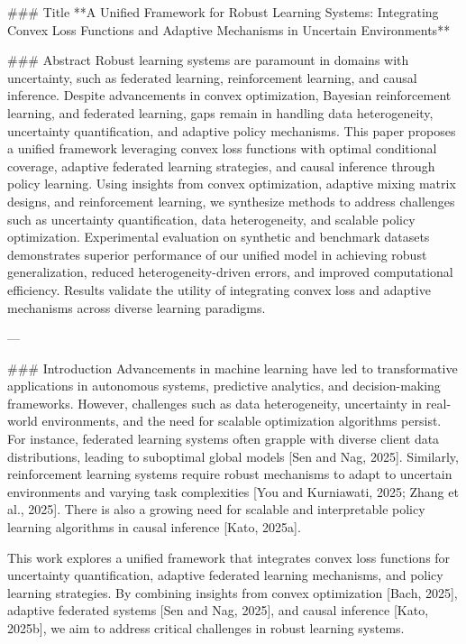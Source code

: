 ### Title
**A Unified Framework for Robust Learning Systems: Integrating Convex Loss Functions and Adaptive Mechanisms in Uncertain Environments**

### Abstract
Robust learning systems are paramount in domains with uncertainty, such as federated learning, reinforcement learning, and causal inference. Despite advancements in convex optimization, Bayesian reinforcement learning, and federated learning, gaps remain in handling data heterogeneity, uncertainty quantification, and adaptive policy mechanisms. This paper proposes a unified framework leveraging convex loss functions with optimal conditional coverage, adaptive federated learning strategies, and causal inference through policy learning. Using insights from convex optimization, adaptive mixing matrix designs, and reinforcement learning, we synthesize methods to address challenges such as uncertainty quantification, data heterogeneity, and scalable policy optimization. Experimental evaluation on synthetic and benchmark datasets demonstrates superior performance of our unified model in achieving robust generalization, reduced heterogeneity-driven errors, and improved computational efficiency. Results validate the utility of integrating convex loss and adaptive mechanisms across diverse learning paradigms.

---

### Introduction
Advancements in machine learning have led to transformative applications in autonomous systems, predictive analytics, and decision-making frameworks. However, challenges such as data heterogeneity, uncertainty in real-world environments, and the need for scalable optimization algorithms persist. For instance, federated learning systems often grapple with diverse client data distributions, leading to suboptimal global models [Sen and Nag, 2025]. Similarly, reinforcement learning systems require robust mechanisms to adapt to uncertain environments and varying task complexities [You and Kurniawati, 2025; Zhang et al., 2025]. There is also a growing need for scalable and interpretable policy learning algorithms in causal inference [Kato, 2025a].

This work explores a unified framework that integrates convex loss functions for uncertainty quantification, adaptive federated learning mechanisms, and policy learning strategies. By combining insights from convex optimization [Bach, 2025], adaptive federated systems [Sen and Nag, 2025], and causal inference [Kato, 2025b], we aim to address critical challenges in robust learning systems.

